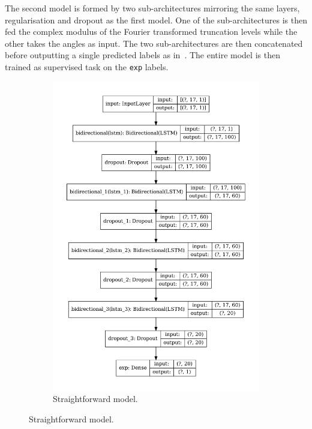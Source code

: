 The second model is formed by two sub-architectures mirroring the same layers, regularisation and dropout as the first model.
One of the sub-architectures is then fed the complex modulus of the Fourier transformed truncation levels while the other takes the angles as input.
The two sub-architectures are then concatenated before outputting a single predicted labels as in~.
The entire model is then trained as supervised task on the \texttt{exp} labels.

\begin{figure}[htbp]
  \centering
  \begin{subfigure}[b]{0.45\linewidth}
    \centering
    \includegraphics[width=\linewidth]{img/lumps_ann_arch_lstm}
    \caption{Straightforward model.}
  \end{subfigure}

\end{figure}
